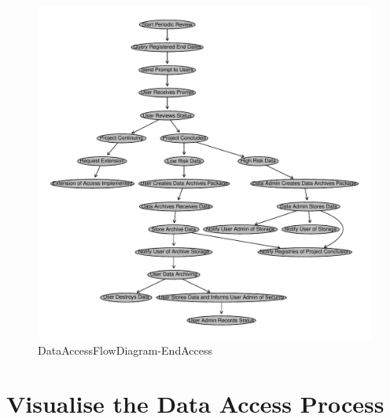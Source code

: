 \documentclass[a4paper]{article}
\begin{document}
\begin{figure}[!h]
\centering
\includegraphics[width=\textwidth]{DataAccessFlowDiagram-EndAccess.pdf}
\caption{DataAccessFlowDiagram-EndAccess}
\label{fig:DataAccessFlowDiagram-EndAccess}
\end{figure}
\clearpage
\section{Visualise the Data Access Process}
\label{sec-6}
\end{document}
